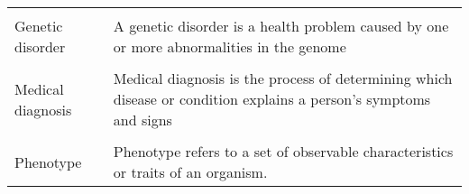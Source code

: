 \documentclass[../report.tex]{subfiles}
\begin{document}
\begin{table}[H]
\begin{tabular}{ll}
			&                                                                                                                                                                                                                                                                                                                                                                                                            \\
			Genetic disorder    & A genetic disorder is a health problem caused by one or more abnormalities in the genome                                                                                                                                                                                                                                                                                                                   \\
			&                                                                                                                                                                                                                                                                                                                                                                                                            \\
			Medical diagnosis   & Medical diagnosis is the process of determining which disease or condition explains a person's symptoms and signs                                                                                                                                                                                                                                                                                          \\
			&                                                                                                                                                                                                                                                                                                                                                                                                            \\
			Phenotype           & Phenotype refers to a set of observable characteristics or traits of an organism.                                                                                                                                                                                                                                                                                                                          \\

\end{tabular}
\end{table}
\end{document}
